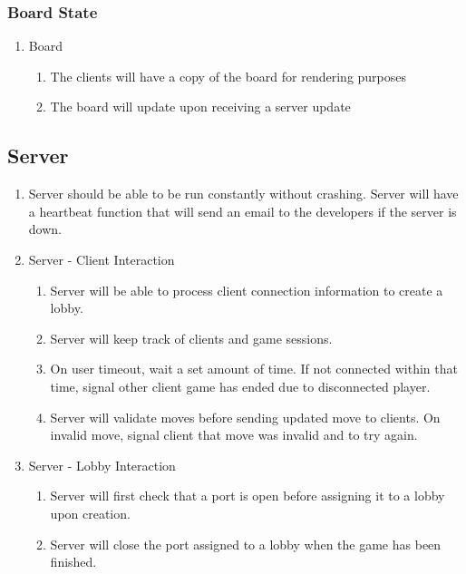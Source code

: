 \documentclass[10pt]{article}
\begin{document}
\subsubsection{Board State}

\begin{enumerate}[resume*]
    \item Board
    \begin{enumerate}[label*=\arabic*.]
        \item The clients will have a copy of the board for rendering purposes
        \item The board will update upon receiving a server update
    \end{enumerate}
\end{enumerate}

\subsection{Server}

\begin{enumerate}[resume*]
    \item Server should be able to be run constantly without crashing.
        \subitem Server will have a heartbeat function that will send an email to the developers if the server is down.
    \item Server - Client Interaction
    \begin{enumerate}[label*=\arabic*.]
        \item Server will be able to process client connection information to create a lobby.
        \item Server will keep track of clients and game sessions.
        \item On user timeout, wait a set amount of time.
            \subitem If not connected within that time, signal other client game has ended due to disconnected player.
        \item Server will validate moves before sending updated move to clients.
            \subitem On invalid move, signal client that move was invalid and to try again.
    \end{enumerate}
    \item Server - Lobby Interaction
    \begin{enumerate}[label*=\arabic*.]
        \item Server will first check that a port is open before assigning it to a lobby upon creation.
        \item Server will close the port assigned to a lobby when the game has been finished.
    \end{enumerate}
\end{enumerate}
\end{document}
